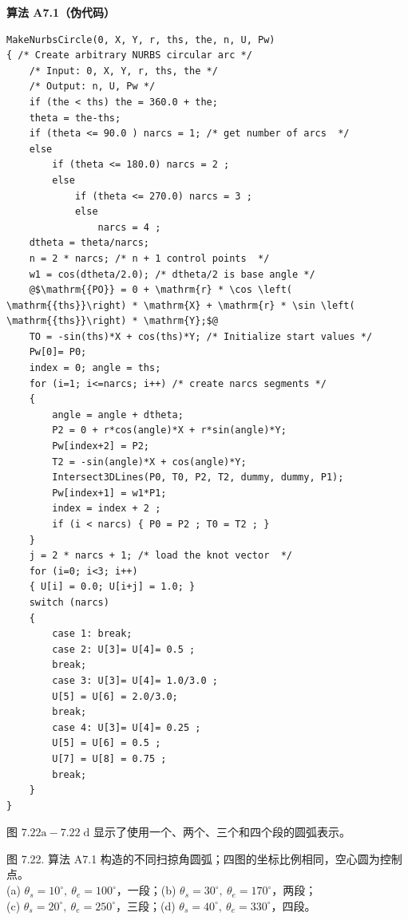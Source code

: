 \documentclass[../main.tex]{subfiles}
\begin{document}
\par\medskip\noindent\textbf{算法 A7.1（伪代码）}\par
\begin{verbatim}
MakeNurbsCircle(0, X, Y, r, ths, the, n, U, Pw)
{ /* Create arbitrary NURBS circular arc */
    /* Input: 0, X, Y, r, ths, the */
    /* Output: n, U, Pw */
    if (the < ths) the = 360.0 + the;
    theta = the-ths;
    if (theta <= 90.0 ) narcs = 1; /* get number of arcs  */
    else
        if (theta <= 180.0) narcs = 2 ;
        else
            if (theta <= 270.0) narcs = 3 ;
            else
                narcs = 4 ;
    dtheta = theta/narcs;
    n = 2 * narcs; /* n + 1 control points  */
    w1 = cos(dtheta/2.0); /* dtheta/2 is base angle */
    @$\mathrm{{PO}} = 0 + \mathrm{r} * \cos \left( \mathrm{{ths}}\right) * \mathrm{X} + \mathrm{r} * \sin \left( \mathrm{{ths}}\right) * \mathrm{Y};$@
    TO = -sin(ths)*X + cos(ths)*Y; /* Initialize start values */
    Pw[0]= P0;
    index = 0; angle = ths;
    for (i=1; i<=narcs; i++) /* create narcs segments */
    {
        angle = angle + dtheta;
        P2 = 0 + r*cos(angle)*X + r*sin(angle)*Y;
        Pw[index+2] = P2;
        T2 = -sin(angle)*X + cos(angle)*Y;
        Intersect3DLines(P0, T0, P2, T2, dummy, dummy, P1);
        Pw[index+1] = w1*P1;
        index = index + 2 ;
        if (i < narcs) { P0 = P2 ; T0 = T2 ; }
    }
    j = 2 * narcs + 1; /* load the knot vector  */
    for (i=0; i<3; i++)
    { U[i] = 0.0; U[i+j] = 1.0; }
    switch (narcs)
    {
        case 1: break;
        case 2: U[3]= U[4]= 0.5 ;
        break;
        case 3: U[3]= U[4]= 1.0/3.0 ;
        U[5] = U[6] = 2.0/3.0;
        break;
        case 4: U[3]= U[4]= 0.25 ;
        U[5] = U[6] = 0.5 ;
        U[7] = U[8] = 0.75 ;
        break;
    }
}
\end{verbatim}

图 \({7.22}\mathrm{a} - {7.22}\mathrm{\;d}\) 显示了使用一个、两个、三个和四个段的圆弧表示。

\begin{center}
\begin{minipage}{30cm}
\vspace*{.6\baselineskip}
\centering
\begin{minipage}[c]{14.5cm}\centering
{}
\end{minipage}\hfill
\begin{minipage}[c]{14.5cm}\centering
{}
\end{minipage}
\par\vspace{.8cm}
\par\smallskip
图 7.22. 算法 A7.1 构造的不同扫掠角圆弧；四图的坐标比例相同，空心圆为控制点。\\
(a) $\theta_s=10^\circ,\ \theta_e=100^\circ$，一段；(b) $\theta_s=30^\circ,\ \theta_e=170^\circ$，两段；\\
(c) $\theta_s=20^\circ,\ \theta_e=250^\circ$，三段；(d) $\theta_s=40^\circ,\ \theta_e=330^\circ$，四段。
\end{minipage}
\end{center}
\end{document}
